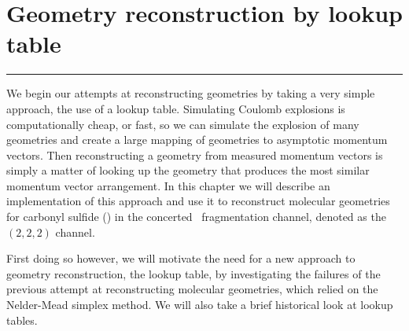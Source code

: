 \chapter{Geometry reconstruction by lookup table}\label{ch:lookupTable}

\vspace{-1.5 em}
\begin{addmargin}[-0.5cm]{0cm}
  \minitoc
\end{addmargin}
\hrule
\vspace{1.5 em}

\noindent
We begin our attempts at reconstructing geometries by taking a very simple approach, the use of a lookup table. Simulating Coulomb explosions is computationally cheap, or fast, so we can simulate the explosion of many geometries and create a large mapping of geometries to asymptotic momentum vectors. Then reconstructing a geometry from measured momentum vectors is simply a matter of looking up the geometry that produces the most similar momentum vector arrangement. In this chapter we will describe an implementation of this approach and use it to reconstruct molecular geometries for carbonyl sulfide () in the  concerted\footnotemark~ fragmentation channel, denoted as the $(2,2,2)$ channel.



First doing so however, we will motivate the need for a new approach to geometry reconstruction, the lookup table, by investigating the failures of the previous attempt at reconstructing molecular geometries, which relied on the Nelder-Mead simplex method. We will also take a brief historical look at lookup tables.

